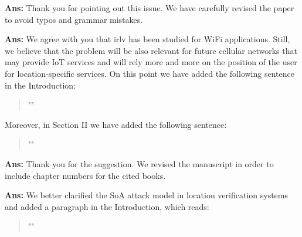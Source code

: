 \documentclass[draftcls,onecolumn,12pt]{IEEEtran}
\newcounter{revc}
\newcommand{\revp}[1]{\zref[revcontent]{#1}}
\begin{document}
\vspace{5mm} %
\begin{framed}
\end{framed}

{\bf Ans:} Thank you for pointing out this issue. We have carefully revised the paper to avoid typos and grammar mistakes.

\vspace{5mm} %
\begin{framed}
\end{framed}

{\bf Ans:} We agree with you that \ac{irlv} has been studied for WiFi applications. Still, we believe that the problem will be also relevant for future cellular networks that may provide IoT services and will rely more and more on the position of the user for location-specific services. On this point we have added the following sentence in the Introduction:
\begin{quote}
    "\revp{WiFi}"
\end{quote}
Moreover, in Section II we have added the following sentence:
\begin{quote}
    "\revp{WiFi2}"
\end{quote}
\vspace{5mm} %
\begin{framed}
\end{framed}

{\bf Ans:} Thank you for the suggestion. We revised the manuscript in order to include chapter numbers for the cited books.

\vspace{5mm} %
\begin{framed}
\end{framed}
{\bf Ans:} We better clarified the SoA attack model in location verification systems and added a paragraph in the Introduction, which reads:
\begin{quote}
"\revp{attack1}"
\end{quote}
\end{document}
